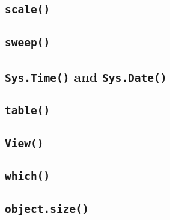 \documentclass[a4paper,12pt]{article}
\begin{document}
\subsection{\texttt{scale()}}
\subsection{\texttt{sweep()}}
\subsection{\texttt{Sys.Time()} and \texttt{Sys.Date()} }
\subsection{\texttt{table()}}
\subsection{\texttt{View()}}
\subsection{\texttt{which()}}

\subsection{\texttt{object.size()}}
\newpage
\end{document}
